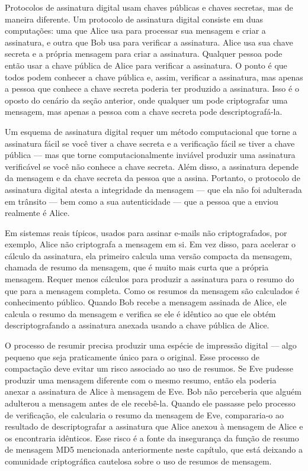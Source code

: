 \documentclass{book}
\begin{document}
Protocolos de assinatura digital usam chaves públicas e chaves secretas, mas de maneira diferente. Um protocolo de assinatura digital consiste em duas computações: uma que Alice usa para processar sua mensagem e criar a assinatura, e outra que Bob usa para verificar a assinatura. Alice usa sua chave secreta e a própria mensagem para criar a assinatura. Qualquer pessoa pode então usar a chave pública de Alice para verificar a assinatura. O ponto é que todos podem conhecer a chave pública e, assim, verificar a assinatura, mas apenas a pessoa que conhece a chave secreta poderia ter produzido a assinatura. Isso é o oposto do cenário da seção anterior, onde qualquer um pode criptografar uma mensagem, mas apenas a pessoa com a chave secreta pode descriptografá-la.

Um esquema de assinatura digital requer um método computacional que torne a assinatura fácil se você tiver a chave secreta e a verificação fácil se tiver a chave pública --- mas que torne computacionalmente inviável produzir uma assinatura verificável se você não conhece a chave secreta. Além disso, a assinatura depende da mensagem e da chave secreta da pessoa que a assina. Portanto, o protocolo de assinatura digital atesta a integridade da mensagem --- que ela não foi adulterada em trânsito --- bem como a sua autenticidade --- que a pessoa que a enviou realmente é Alice.

Em sistemas reais típicos, usados para assinar e-mails não criptografados, por exemplo, Alice não criptografa a mensagem em si. Em vez disso, para acelerar o cálculo da assinatura, ela primeiro calcula uma versão compacta da mensagem, chamada de resumo da mensagem, que é muito mais curta que a própria mensagem. Requer menos cálculos para produzir a assinatura para o resumo do que para a mensagem completa. Como os resumos da mensagem são calculados é conhecimento público. Quando Bob recebe a mensagem assinada de Alice, ele calcula o resumo da mensagem e verifica se ele é idêntico ao que ele obtém descriptografando a assinatura anexada usando a chave pública de Alice.

O processo de resumir precisa produzir uma espécie de impressão digital --- algo pequeno que seja praticamente único para o original. Esse processo de compactação deve evitar um risco associado ao uso de resumos. Se Eve pudesse produzir uma mensagem diferente com o mesmo resumo, então ela poderia anexar a assinatura de Alice à mensagem de Eve. Bob não perceberia que alguém adulterou a mensagem antes de ele recebê-la. Quando ele passasse pelo processo de verificação, ele calcularia o resumo da mensagem de Eve, compararia-o ao resultado de descriptografar a assinatura que Alice anexou à mensagem de Alice e os encontraria idênticos. Esse risco é a fonte da insegurança da função de resumo de mensagem MD5 mencionada anteriormente neste capítulo, que está deixando a comunidade criptográfica cautelosa sobre o uso de resumos de mensagem.
\end{document}
